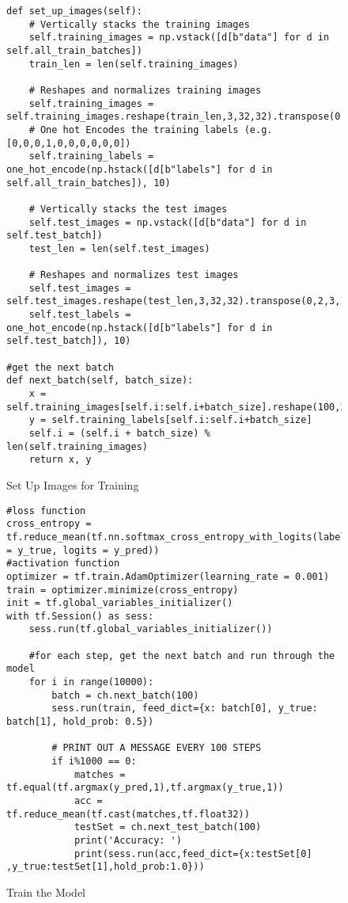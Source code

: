 \begin{figure}[h]
\caption{Set Up Images for Training \parencite{udemy}}
\label{lst:setUpImages}
\begin{lstlisting}[style=Python]
def set_up_images(self):
    # Vertically stacks the training images
    self.training_images = np.vstack([d[b"data"] for d in self.all_train_batches])
    train_len = len(self.training_images)
    
    # Reshapes and normalizes training images
    self.training_images = self.training_images.reshape(train_len,3,32,32).transpose(0,2,3,1)/255
    # One hot Encodes the training labels (e.g. [0,0,0,1,0,0,0,0,0,0])
    self.training_labels = one_hot_encode(np.hstack([d[b"labels"] for d in self.all_train_batches]), 10)

    # Vertically stacks the test images
    self.test_images = np.vstack([d[b"data"] for d in self.test_batch])
    test_len = len(self.test_images)
    
    # Reshapes and normalizes test images
    self.test_images = self.test_images.reshape(test_len,3,32,32).transpose(0,2,3,1)/255
    self.test_labels = one_hot_encode(np.hstack([d[b"labels"] for d in self.test_batch]), 10)
    
#get the next batch
def next_batch(self, batch_size):
    x = self.training_images[self.i:self.i+batch_size].reshape(100,32,32,3)
    y = self.training_labels[self.i:self.i+batch_size]
    self.i = (self.i + batch_size) % len(self.training_images)
    return x, y
\end{lstlisting}
\end{figure}

\begin{figure}[h]
\caption{Train the Model \parencite{udemy}}
\label{lst:trainModel2}
\begin{lstlisting}[style=Python]
#loss function
cross_entropy = tf.reduce_mean(tf.nn.softmax_cross_entropy_with_logits(labels = y_true, logits = y_pred))
#activation function
optimizer = tf.train.AdamOptimizer(learning_rate = 0.001)
train = optimizer.minimize(cross_entropy)
init = tf.global_variables_initializer()
with tf.Session() as sess:
    sess.run(tf.global_variables_initializer())

    #for each step, get the next batch and run through the model
    for i in range(10000):
        batch = ch.next_batch(100)
        sess.run(train, feed_dict={x: batch[0], y_true: batch[1], hold_prob: 0.5})
        
        # PRINT OUT A MESSAGE EVERY 100 STEPS
        if i%1000 == 0:
            matches = tf.equal(tf.argmax(y_pred,1),tf.argmax(y_true,1))
            acc = tf.reduce_mean(tf.cast(matches,tf.float32))
            testSet = ch.next_test_batch(100)
            print('Accuracy: ')
            print(sess.run(acc,feed_dict={x:testSet[0] ,y_true:testSet[1],hold_prob:1.0}))
\end{lstlisting}
\end{figure}


